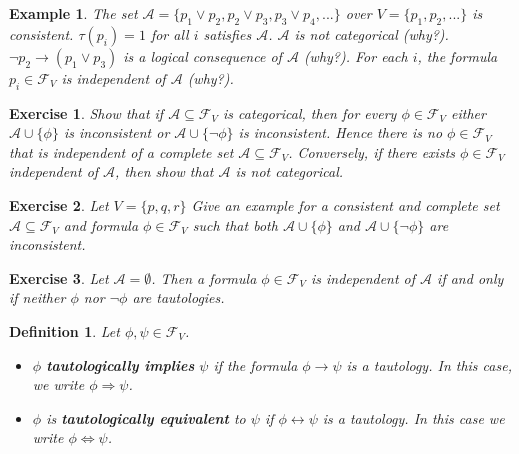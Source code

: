 \documentclass[a4paper,11pt]{article}
\newtheorem{definition}{Definition}
\newtheorem{exercise}{Exercise}
\newtheorem{example}{Example}
\begin{document}
\begin{example}
 The set $\mathcal{A}=\{p_1\vee p_2, p_2\vee p_3,p_3\vee p_4,...\}$ over $V=\{p_1,p_2,...\}$
is consistent. $\tau(p_i)=1$ for all $i$ satisfies $\mathcal{A}$.  
$\mathcal{A}$ is not categorical (why?).  $\neg p_2\rightarrow (p_1\vee p_3)$ is a logical
consequence of $\mathcal{A}$ (why?).  For each $i$, 
the formula $p_i\in \mathcal{F}_V$ is independent of $\mathcal{A}$ (why?).
\end{example}

\begin{exercise}
Show that if $\mathcal{A}\subseteq \mathcal{F}_V$ is categorical, then for 
every $\phi \in \mathcal{F}_V$ either 
$\mathcal{A}\cup \{\phi\}$ is inconsistent or $\mathcal{A}\cup \{\neg\phi\}$ is 
inconsistent. Hence there is no $\phi \in \mathcal{F}_V$ that is 
independent of a complete set $\mathcal{A}\subseteq \mathcal{F}_V$.  Conversely, if there exists
$\phi\in \mathcal{F}_{V}$ independent of $\mathcal{A}$, then show that $\mathcal{A}$ is not categorical. 
\end{exercise}

\begin{exercise}
Let $V=\{p,q,r\}$  Give an example for a consistent and complete set 
$\mathcal{A}\subseteq \mathcal{F}_V$ and formula $\phi \in \mathcal{F}_V$ 
such that both  $\mathcal{A}\cup \{\phi\}$ and $\mathcal{A}\cup \{\neg\phi\}$ 
are inconsistent.  
\end{exercise}

\begin{exercise}
Let $\mathcal{A}=\emptyset$.  Then a formula $\phi \in \mathcal{F}_V$ is independent of $\mathcal{A}$ 
if and only if neither $\phi$ nor $\neg \phi$ are tautologies.  
\end{exercise}



\begin{definition}
Let $\phi,\psi \in \mathcal{F}_V$. 
\begin{itemize}
 \item $\phi$ {\bf tautologically implies} $\psi$ if the formula $\phi\rightarrow\psi$ is
a tautology.  In this case, we write $\phi \Rightarrow \psi$.  
 \item $\phi$ is {\bf tautologically equivalent} to $\psi$ if $\phi\leftrightarrow \psi$ is
a tautology.  In this case we write $\phi \Leftrightarrow \psi$.  
\end{itemize}
\end{definition} 
\end{document}
